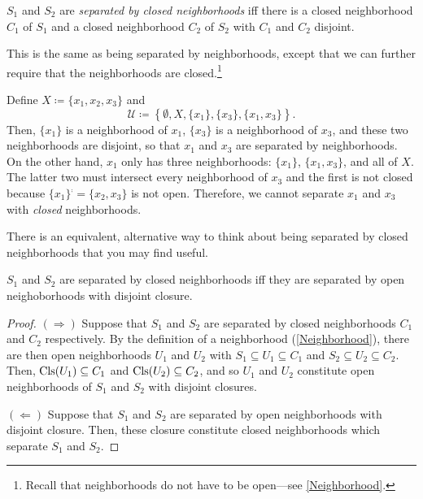 \begin{dfn}\label{SeparatedByClosedNeighborhoods}
$S_1$ and $S_2$ are \emph{separated by closed neighborhoods} iff there is a closed neighborhood $C_1$ of $S_1$ and a closed neighborhood $C_2$ of $S_2$ with $C_1$ and $C_2$ disjoint.
\begin{rmk}
This is the same as being separated by neighborhoods, except that we can further require that the neighborhoods are closed.\footnote{Recall that neighborhoods do not have to be open---see \cref{Neighborhood}.}
\end{rmk}
\end{dfn}
\begin{exm}\label{exm4.5.11}
Define $X\coloneqq \{ x_1,x_2,x_3\}$ and
\begin{equation}
\mathcal{U}\coloneqq \left\{ \emptyset ,X,\{ x_1\} ,\{ x_3\} ,\{ x_1,x_3\} \right\} .
\end{equation}
Then, $\{ x_1\}$ is a neighborhood of $x_1$, $\{ x_3\}$ is a neighborhood of $x_3$, and these two neighborhoods are disjoint, so that $x_1$ and $x_3$ are separated by neighborhoods.  On the other hand, $x_1$ only has three neighborhoods:  $\{ x_1\}$, $\{ x_1,x_3\}$, and all of $X$.  The latter two must intersect every neighborhood of $x_3$ and the first is not closed because $\{ x_1\} ^{\comp}=\{ x_2,x_3\}$ is not open.  Therefore, we cannot separate $x_1$ and $x_3$ with \emph{closed} neighborhoods.
\end{exm}
There is an equivalent, alternative way to think about being separated by closed neighborhoods that you may find useful.
\begin{prp}\label{prp4.5.13}
$S_1$ and $S_2$ are separated by closed neighborhoods iff they are separated by open neighoborhoods with disjoint closure.
\begin{proof}
$(\Rightarrow )$ Suppose that $S_1$ and $S_2$ are separated by closed neighborhoods $C_1$ and $C_2$ respectively.  By the definition of a neighborhood (\cref{Neighborhood}), there are then open neighborhoods $U_1$ and $U_2$ with $S_1\subseteq U_1\subseteq C_1$ and $S_2\subseteq U_2\subseteq C_2$.  Then, $\operatorname{Cls} (U_1)\subseteq C_1$ and $\operatorname{Cls} (U_2)\subseteq C_2$, and so $U_1$ and $U_2$ constitute open neighborhoods of $S_1$ and $S_2$ with disjoint closures.

\blankline
\noindent
$(\Leftarrow )$ Suppose that $S_1$ and $S_2$ are separated by open neighborhoods with disjoint closure.  Then, these closure constitute closed neighborhoods which separate $S_1$ and $S_2$.
\end{proof}
\end{prp}
